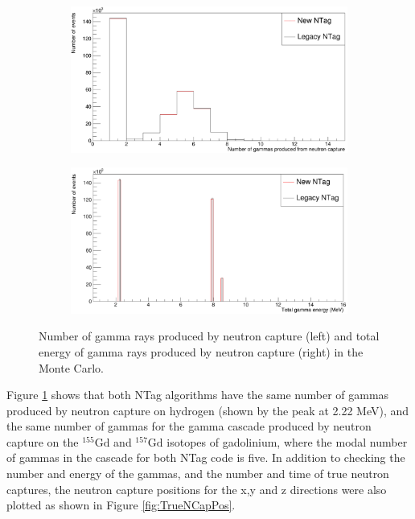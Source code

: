 \begin{figure}
    \centering
     \begin{subfigure}[b]{0.49\linewidth}
      \includegraphics[width=\linewidth]{Figures/NGamma.PNG}
     \end{subfigure}
     \begin{subfigure}[b]{0.49\linewidth}
       \includegraphics[width=\linewidth]{Figures/TotGammaE.PNG}
      \end{subfigure} 
      \caption{Number of gamma rays produced by neutron capture (left) and total energy of gamma rays produced by neutron capture (right) in the Monte Carlo.}
      \label{fig:GammaPlots}
\end{figure}

Figure \ref{fig:GammaPlots} shows that both NTag algorithms have the same number of gammas produced by neutron capture on hydrogen (shown by the peak at 2.22 MeV), and the same number of gammas for the gamma cascade produced by neutron capture on the ${ }^{155} \mathrm{Gd}$ and ${ }^{157} \mathrm{Gd}$ isotopes of gadolinium, where the modal number of gammas in the cascade for both NTag code is five. In addition to checking the number and energy of the gammas, and the number and time of true neutron captures, the neutron capture positions for the x,y and z directions were also plotted as shown in Figure \ref{fig:TrueNCapPos}.

